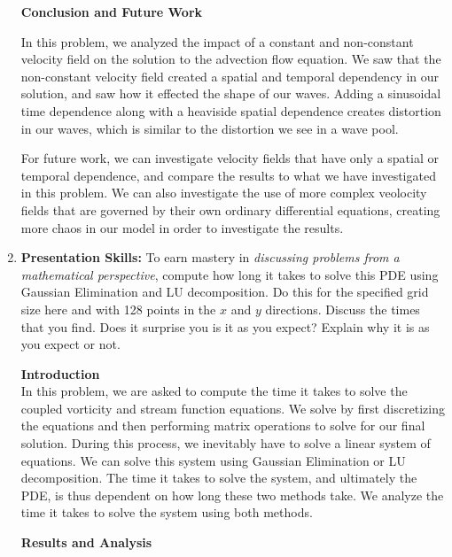 \documentclass[a4paper,12pt, fleqn]{article}
\begin{document}
\begin{enumerate}
        \textbf{Conclusion and Future Work}

        In this problem, we analyzed the impact of a constant and non-constant velocity field on the solution to the
        advection flow equation. We saw that the non-constant velocity field created a spatial and temporal dependency
        in our solution, and saw how it effected the shape of our waves. Adding a sinusoidal time dependence along with a 
        heaviside spatial dependence creates distortion in our waves, which is similar to the distortion we see in a wave pool.

        For future work, we can investigate velocity fields that have only a spatial or temporal dependence, and compare 
        the results to what we have investigated in this problem. We can also investigate the use of more complex
        veolocity fields that are governed by their own ordinary differential equations, creating more chaos in 
        our model in order to investigate the results. 

    \item    
        \textbf{Presentation Skills:} To earn mastery in \textit{discussing problems from a
        mathematical perspective}, compute how long it takes to solve
        this PDE using Gaussian Elimination and LU decomposition. Do
        this for the specified grid size here and with 128 points in
        the $x$ and $y$ directions. Discuss the times that you find.
        Does it surprise you is it as you expect? Explain why it is as
        you expect or not. 

        \textbf{Introduction}\\
        In this problem, we are asked to compute the time it takes to solve the coupled vorticity
        and stream function equations. We solve by first discretizing the equations and then
        performing matrix operations to solve for our final solution. During this process, 
        we inevitably have to solve a linear system of equations. We can solve this system
        using Gaussian Elimination or LU decomposition. The time it takes to solve the system, 
        and ultimately the PDE, is thus dependent on how long these two methods take. We 
        analyze the time it takes to solve the system using both methods.

        
        \textbf{Results and Analysis}


\end{enumerate}
\end{document}
